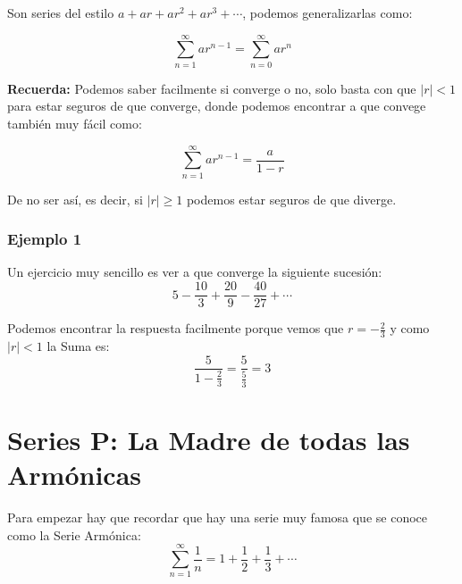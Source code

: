 \documentclass[12pt]{report}                                %
\begin{document}
        Son series del estilo $a + ar + ar^2 + ar^3 + \cdots$, podemos
        generalizarlas como:

        \begin{equation}
            \sum_{n=1}^{\infty} ar^{n-1} = \sum_{n=0}^{\infty} ar^n 
        \end{equation}


        \textbf{Recuerda:}
        Podemos saber facilmente si converge o no, solo basta con que $|r| < 1$ 
        para estar seguros de que converge, donde podemos encontrar a que convege
        también muy fácil como:

        \begin{equation}
            \sum_{n=1}^{\infty} ar^{n-1} = \frac{a}{1-r}
        \end{equation}

        De no ser así, es decir, si $|r| \geq 1$ podemos estar seguros de que diverge.


        \subsubsection{Ejemplo 1}
            Un ejercicio muy sencillo es ver a que converge la siguiente sucesión:
            \begin{equation*}
                5 - \frac{10}{3} + \frac{20}{9} - \frac{40}{27} + \cdots
            \end{equation*}

            Podemos encontrar la respuesta facilmente porque vemos que
            $r=-\frac{2}{3}$ y como $|r|<1$ la Suma es:
            \begin{equation*}
                \frac{5}{1-\frac{2}{3}} = \frac{5}{\frac{5}{3}} = 3
            \end{equation*}



    \clearpage
    \section{Series P: La Madre de todas las Armónicas}
        Para empezar hay que recordar que hay una serie muy famosa que se conoce como
        la Serie Armónica:
        \begin{equation}
            \sum_{n=1}^{\infty} \frac{1}{n} = 1 + \frac{1}{2}  + \frac{1}{3} + \cdots
        \end{equation}
\end{document}
